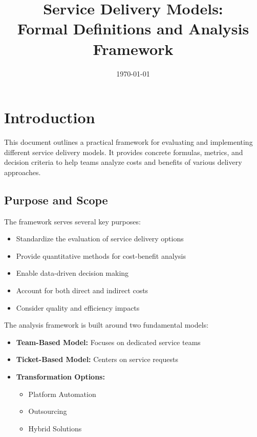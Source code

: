 \documentclass[12pt,a4paper]{article}
\title{\textbf{\LARGE Service Delivery Models:\\[0.3em] Formal Definitions and Analysis Framework}}
\author{\Large}
\date{\today}
\newenvironment{definition}[1]
{\begin{mdframed}[style=definitionstyle,frametitle={Definition: #1}]}
{\end{mdframed}}
\newenvironment{explanation}
{\begin{mdframed}[style=explanationstyle,frametitle={Explanation}]}
{\end{mdframed}}
\begin{document}
\maketitle
\thispagestyle{empty}
\tableofcontents
\clearpage

\section{Introduction}
This document outlines a practical framework for evaluating and implementing different service delivery models. It provides concrete formulas, metrics, and decision criteria to help teams analyze costs and benefits of various delivery approaches. 

\subsection{Purpose and Scope}
\begin{definition}{Framework Purpose}
The framework serves several key purposes:
\begin{itemize}
    \item Standardize the evaluation of service delivery options
    \item Provide quantitative methods for cost-benefit analysis
    \item Enable data-driven decision making
    \item Account for both direct and indirect costs
    \item Consider quality and efficiency impacts
\end{itemize}
\end{definition}

\begin{explanation}
The analysis framework is built around two fundamental models:
\begin{itemize}
    \item \textbf{Team-Based Model:} Focuses on dedicated service teams
    \item \textbf{Ticket-Based Model:} Centers on service requests
    \item \textbf{Transformation Options:}
    \begin{itemize}
        \item Platform Automation
        \item Outsourcing
        \item Hybrid Solutions
    \end{itemize}
\end{itemize}
\end{explanation}
\end{document}
